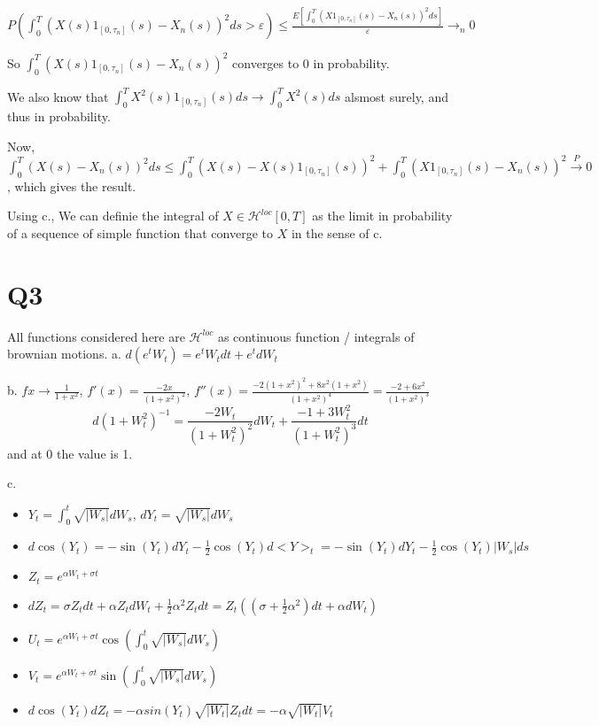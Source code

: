 \documentclass[11pt]{article}
\begin{document}
\(P(\int_0^T (X(s)1_{[0, \tau_n]}(s) - X_n(s))^2 ds > \varepsilon) \le \frac{E[\int_0^T (X1_{[0, \tau_n]}(s) - X_n(s))^2 ds]}{\varepsilon} \rightarrow_n 0\)

So \(\int_0^T (X(s)1_{[0, \tau_n]}(s) - X_n(s))^2\) converges to 0 in probability.

We also know that \(\int_0^T X^2(s)1_{[0, \tau_n]}(s) ds \rightarrow \int_0^T X^2(s) ds\) alsmost surely, and thus in probability.

Now, \(\int_0^T (X(s) - X_n(s))^2 ds \le \int_0^T (X(s) - X(s)1_{[0, \tau_n]}(s))^2 + \int_0^T (X1_{[0, \tau_n]}(s) - X_n(s))^2 \overset{P}{\rightarrow} 0\), which gives the result.

Using c., We can definie the integral of  \(X \in \mathcal H^{loc}[0, T]\) as the limit in probability of a sequence of simple function that converge to \(X\) in the sense of c.

\section{Q3}
\label{sec:orgheadline4}

All functions considered here are \(\mathcal H^{loc}\) as continuous function / integrals of brownian motions.
a. \(d(e^tW_t) = e^tW_t dt + e^tdW_t\)

b. \(f x \rightarrow \frac1{1+x^2}\), \(f'(x) = \frac{-2x}{(1+x^2)^2}\), \(f''(x) = \frac{-2(1+x^2)^2 + 8x^2(1+x^2)}{(1+x^2)^4} = \frac{-2 + 6x^2}{(1+x^2)^3}\)
$$d(1+W_t^2)^{-1} = \frac{-2W_t}{(1+W_t^2)^2}dW_t + \frac{-1 + 3W_t^2}{(1+W_t^2)^3}dt$$
and at \(0\) the value is 1.

c.
\begin{itemize}
\item \(Y_t = \int_0^t \sqrt{|W_s|} dW_s\), \(dY_t = \sqrt{|W_s|} dW_s\)
\item \(d \cos(Y_t) = -\sin(Y_t) dY_t - \frac12 \cos(Y_t) d < Y >_t = -\sin(Y_t) dY_t - \frac12 \cos(Y_t) |W_s| ds\)

\item \(Z_t = e^{\alpha W_t + \sigma t}\)
\item \(dZ_t = \sigma Z_t dt + \alpha Z_t dW_t + \frac12 \alpha^2 Z_t dt = Z_t( (\sigma + \frac12 \alpha^2)dt + \alpha dW_t)\)
\item \(U_t = e^{\alpha W_t + \sigma t} \cos(\int_0^t \sqrt{|W_s|} dW_s)\)
\item \(V_t = e^{\alpha W_t + \sigma t} \sin(\int_0^t \sqrt{|W_s|} dW_s)\)
\item \(d\cos(Y_t) dZ_t = -\alpha sin(Y_t)\sqrt{|W_t|}Z_t dt = -\alpha \sqrt{|W_t|} V_t\)
\end{itemize}
\end{document}
